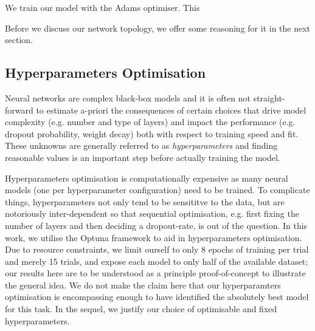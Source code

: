 \documentclass[british,12p]{article}
\begin{document}
    We train our model with the Adams optimiser. This 
    
    Before we discuss our network topology, we offer some reasoning for it in the next section.

 	
    \subsection{Hyperparameters Optimisation}
    Neural networks are complex black-box models and it is often not straight-forward to estimate a-priori the consequences of certain choices that drive model complexity (e.g. number and type of layers) and impact the performance (e.g. dropout probability, weight decay) both with respect to training speed and fit. These unknowns are generally referred to as \textit{hyperparameters} and finding reasonable values is an important step before actually training the model.
    
    Hyperparameters optimisation is computationally expensive as many neural models (one per hyperparameter configuration) need to be trained. To complicate things, hyperparameters not only tend to be sensititve to the data, but are notoriously inter-dependent so that sequential optimisation, e.g. first fixing the number of layers and then deciding a dropout-rate, is out of the question. In this work, we utilise the Optuna framework to aid in hyperparameters optimisation. Due to resource constraints, we limit ourself to only 8 epochs of training per trial and merely 15 trials, and expose each model to only half of the available dataset; our results here are to be understood as a principle proof-of-concept to illustrate the general idea. We do not make the claim here that our hyperparamters optimisation is encompassing enough to have identified the absolutely best model for this task. In the sequel, we justify our choice of optimisable and fixed hyperparameters.
    
\end{document}
